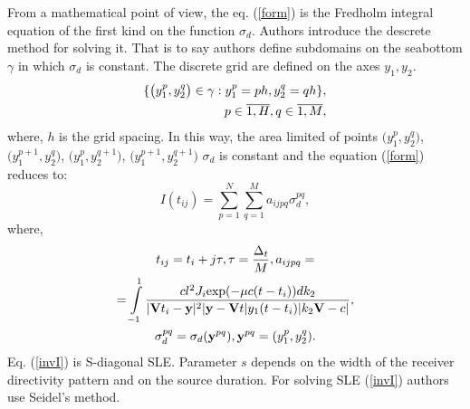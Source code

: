\documentclass{procDDs}
\begin{document}
From a mathematical point of view, the eq. (\ref{form}) is the Fredholm integral equation of the first kind on the function $\sigma_d$. Authors introduce the descrete method for solving it. That is to say authors define subdomains on the seabottom $\gamma$ in which $\sigma_d$ is constant. The discrete grid are defined  on the axes $y_1, y_2$.
\begin{align}
	\{ \big( y_1^p, y_2^q \big) \in\gamma: y_1^p = ph, y_2^q = qh \}, \notag \\ 
	p \in \overline{1, H}, q \in \overline{1, M}, 
\end{align}
where, $h$ is the grid spacing. In this way, the area limited of points $\big(y_1^p, y_2^q\big)$, $\big(y_1^{p+1}, y_2^q\big)$, $\big(y_1^p, y_2^{q+1}\big)$, $\big(y_1^{p+1}, y_2^{q+1}\big)$ $\sigma_d$  is constant and the equation (\ref{form}) reduces to:
\begin{equation}
\label{invI}
I(t_{ij}) = \sum \limits_{p=1}^{N} \sum \limits_{q=1}^{M} a_{ijpq}\sigma_d^{pq},
\end{equation}
where,
\begin{multline*}
	t_{ij} = t_i+j\tau, \tau = \frac{\Delta_t}{M}, a_{ijpq} = \\ 
	=  \int\limits_{-1}^{1}
	\frac{cl^2J_i \text{exp}(-\mu c(t-t_i))dk_2}{|\mathbf{V}t_i-\mathbf{y}|^2|\mathbf{y}-\mathbf{V}t|y_1(t-t_i)|k_2 \mathbf{V}-c|}, \\
	\sigma_d^{pq} = \sigma_d(\textbf{y}^{pq}), \textbf{y}^{pq} = (y_1^p, y_2^q).
\end{multline*}
Eq. (\ref{invI}) is S-diagonal SLE. Parameter $s$ depends on the width of the receiver directivity pattern and on the source duration. For solving SLE (\ref{invI}) authors use  Seidel's method.
\end{document}
